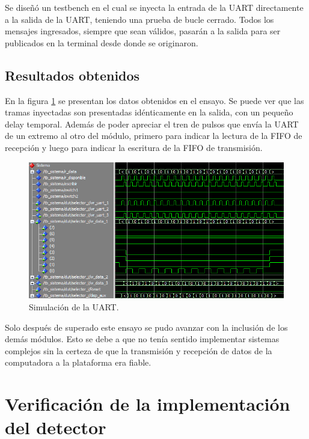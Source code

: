 		Se diseñó un testbench en el cual se inyecta la entrada de la UART directamente a la salida de la UART, teniendo una prueba de bucle cerrado. Todos los mensajes ingresados, siempre que sean válidos, pasarán a la salida para ser publicados en la terminal desde donde se originaron.
						
	\subsection{Resultados obtenidos}
				
		En la figura \ref{fig:Test_UART} se presentan los datos obtenidos en el ensayo. Se puede ver que las tramas inyectadas son presentadas idénticamente en la salida, con un pequeño delay temporal. Además de poder apreciar el tren de pulsos que envía la UART de un extremo al otro del módulo, primero para indicar la lectura de la FIFO de recepción y luego para indicar la escritura de la FIFO de transmisión.
		
		\begin{figure}[h]
		\centering
		\includegraphics[scale=0.7]{./Figures/Test/UART}
			\caption{Simulación de la UART.}
			\label{fig:Test_UART}
		\end{figure}
			
		\vspace{10cm}
			
		Solo después de superado este ensayo se pudo avanzar con la inclusión de los demás módulos. Esto se debe a que no tenía sentido implementar sistemas complejos sin la certeza de que la transmisión y recepción de datos de la computadora a la plataforma era fiable. %
	
\section{Verificación de la implementación del detector}

